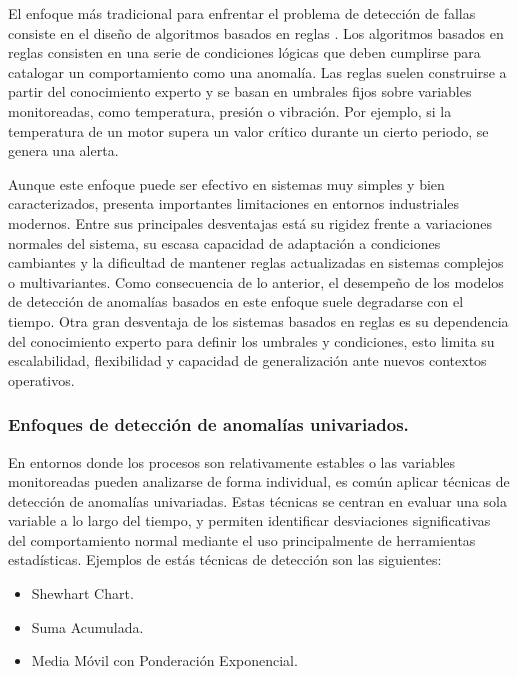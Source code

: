 \documentclass[11pt,a4paper,spanish]{book}
\numberwithin{equation}{chapter}
\numberwithin{figure}{chapter}
\begin{document}
El enfoque más tradicional para enfrentar el problema de detección de fallas consiste en 
el diseño de algoritmos basados en reglas \cite{gami2024datacleansing}. Los algoritmos 
basados en reglas consisten en una serie de condiciones lógicas que deben cumplirse para
catalogar un comportamiento como una anomalía. 
Las reglas suelen construirse a partir del 
conocimiento experto y se basan en umbrales fijos sobre variables monitoreadas, como 
temperatura, presión o vibración. Por ejemplo, si la temperatura de un motor supera un 
valor crítico durante un cierto periodo, se genera una alerta. 


Aunque este enfoque puede ser efectivo en sistemas muy simples y bien caracterizados, 
presenta importantes limitaciones en entornos industriales modernos. 
Entre sus principales desventajas está su rigidez frente a variaciones normales del 
sistema, su escasa capacidad de adaptación a condiciones cambiantes y la dificultad 
de mantener reglas actualizadas en sistemas complejos o multivariantes. 
Como consecuencia de lo anterior, el desempeño de los modelos de detección de 
anomalías basados en este enfoque suele degradarse con el tiempo. 
Otra gran desventaja de los sistemas basados en reglas es su dependencia del 
conocimiento experto para definir los umbrales y condiciones, esto limita su 
escalabilidad, flexibilidad y capacidad de generalización ante nuevos contextos 
operativos.

\subsubsection{Enfoques de detección de anomalías univariados.}

En entornos donde los procesos son relativamente estables o las variables monitoreadas 
pueden analizarse de forma individual, es común aplicar técnicas de detección de 
anomalías univariadas. 
Estas técnicas se centran en evaluar una sola variable a lo largo del tiempo, y 
permiten identificar desviaciones significativas del comportamiento normal mediante el 
uso principalmente de herramientas estadísticas. Ejemplos de estás técnicas de 
detección son las siguientes: 

\begin{itemize}
	\item Shewhart Chart.
	\item Suma Acumulada.
	\item Media Móvil con Ponderación Exponencial.
\end{itemize}
\end{document}

